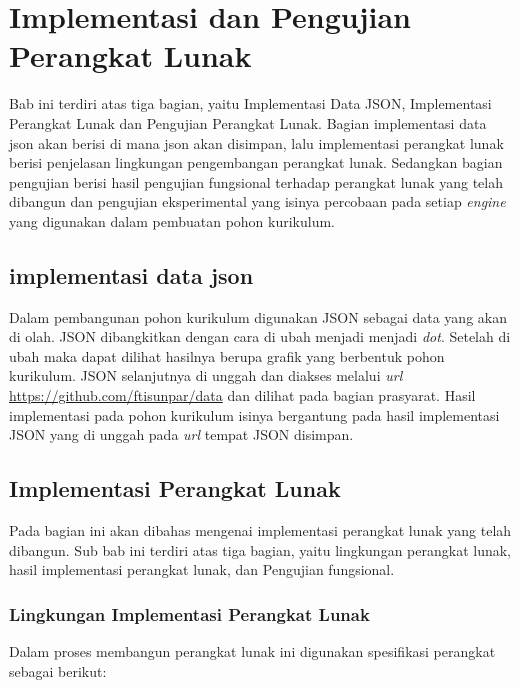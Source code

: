 \chapter{Implementasi dan Pengujian Perangkat Lunak}
\label{chap: Implementasi dan Pengujian Perangkat Lunak}

Bab ini terdiri atas tiga bagian, yaitu Implementasi Data JSON, Implementasi Perangkat Lunak dan Pengujian Perangkat Lunak. Bagian implementasi data json akan berisi di mana json akan disimpan, lalu implementasi perangkat lunak berisi penjelasan lingkungan pengembangan perangkat lunak. Sedangkan bagian pengujian berisi hasil pengujian fungsional terhadap perangkat lunak yang telah dibangun dan pengujian eksperimental yang isinya percobaan pada setiap \textit{engine} yang digunakan dalam pembuatan pohon kurikulum.

\section{implementasi data json}
\label{sec: implementasi data json}

Dalam pembangunan pohon kurikulum digunakan JSON sebagai data yang akan di olah. JSON dibangkitkan dengan cara di ubah menjadi menjadi \textit{dot}. Setelah di ubah maka dapat dilihat hasilnya berupa grafik yang berbentuk pohon kurikulum. JSON selanjutnya di unggah dan diakses melalui \textit{url} \url{https://github.com/ftisunpar/data} dan dilihat pada bagian prasyarat. Hasil implementasi pada pohon kurikulum isinya bergantung pada hasil implementasi JSON yang di unggah pada \textit{url} tempat JSON disimpan.

\section{Implementasi Perangkat Lunak}
\label{sec: Implementasi Perangkat Lunak}

Pada bagian ini akan dibahas mengenai implementasi perangkat lunak yang telah dibangun. Sub bab ini terdiri atas tiga bagian, yaitu lingkungan perangkat lunak, hasil implementasi perangkat lunak, dan Pengujian fungsional.

\subsection{Lingkungan Implementasi Perangkat Lunak}
\label{sec: Lingkungan Implementasi Perangkat Lunak}

Dalam proses membangun perangkat lunak ini digunakan spesifikasi perangkat sebagai berikut:

